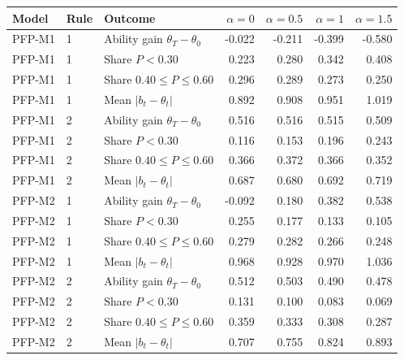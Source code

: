 \begin{tabular}{l l l r r r r}
\toprule
Model & Rule & Outcome & $\alpha=0$ & $\alpha=0.5$ & $\alpha=1$ & $\alpha=1.5$ \\
\midrule
PFP-M1 & 1 & Ability gain $\theta_T-\theta_0$ & -0.022 & -0.211 & -0.399 & -0.580 \\
PFP-M1 & 1 & Share $P < 0.30$ & 0.223 & 0.280 & 0.342 & 0.408 \\
PFP-M1 & 1 & Share $0.40 \le P \le 0.60$ & 0.296 & 0.289 & 0.273 & 0.250 \\
PFP-M1 & 1 & Mean $|b_t-\theta_t|$ & 0.892 & 0.908 & 0.951 & 1.019 \\
PFP-M1 & 2 & Ability gain $\theta_T-\theta_0$ & 0.516 & 0.516 & 0.515 & 0.509 \\
PFP-M1 & 2 & Share $P < 0.30$ & 0.116 & 0.153 & 0.196 & 0.243 \\
PFP-M1 & 2 & Share $0.40 \le P \le 0.60$ & 0.366 & 0.372 & 0.366 & 0.352 \\
PFP-M1 & 2 & Mean $|b_t-\theta_t|$ & 0.687 & 0.680 & 0.692 & 0.719 \\
PFP-M2 & 1 & Ability gain $\theta_T-\theta_0$ & -0.092 & 0.180 & 0.382 & 0.538 \\
PFP-M2 & 1 & Share $P < 0.30$ & 0.255 & 0.177 & 0.133 & 0.105 \\
PFP-M2 & 1 & Share $0.40 \le P \le 0.60$ & 0.279 & 0.282 & 0.266 & 0.248 \\
PFP-M2 & 1 & Mean $|b_t-\theta_t|$ & 0.968 & 0.928 & 0.970 & 1.036 \\
PFP-M2 & 2 & Ability gain $\theta_T-\theta_0$ & 0.512 & 0.503 & 0.490 & 0.478 \\
PFP-M2 & 2 & Share $P < 0.30$ & 0.131 & 0.100 & 0.083 & 0.069 \\
PFP-M2 & 2 & Share $0.40 \le P \le 0.60$ & 0.359 & 0.333 & 0.308 & 0.287 \\
PFP-M2 & 2 & Mean $|b_t-\theta_t|$ & 0.707 & 0.755 & 0.824 & 0.893 \\
\bottomrule
\end{tabular}
